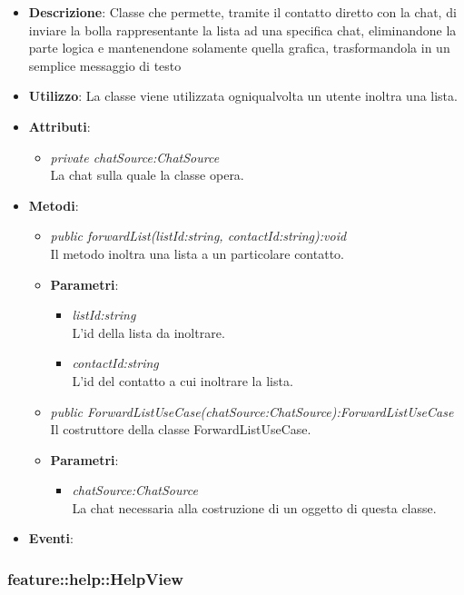 \begin{itemize}
\item \textbf{Descrizione}: Classe che permette, tramite il contatto diretto con la chat, di inviare la bolla rappresentante la lista ad una specifica chat, eliminandone la parte logica e mantenendone solamente quella grafica, trasformandola in un semplice messaggio di testo
\item \textbf{Utilizzo}: La classe viene utilizzata ogniqualvolta un utente inoltra una lista.
\item \textbf{Attributi}: 
	\begin{itemize}
	\item \textit{private chatSource:ChatSource}\\
	La chat sulla quale la classe opera.
	\end{itemize}
\item \textbf{Metodi}:
	\begin{itemize}
	\item \textit{public forwardList(listId:string, contactId:string):void}\\
	Il metodo inoltra una lista a un particolare contatto.
			\item{\textbf{Parametri}: \begin{itemize}
			\item \textit{listId:string}\\
			L'id della lista da inoltrare.
			\item \textit{contactId:string}\\
			L'id del contatto a cui inoltrare la lista.
			\end{itemize}}
	\item \textit{public ForwardListUseCase(chatSource:ChatSource):ForwardListUseCase}\\
	Il costruttore della classe ForwardListUseCase.
			\item{\textbf{Parametri}: \begin{itemize}
			\item \textit{chatSource:ChatSource}\\
			La chat necessaria alla costruzione di un oggetto di questa classe.
			\end{itemize}}
	\end{itemize}
\item \textbf{Eventi}:
\end{itemize}

\subsubsection{feature::help::HelpView}

